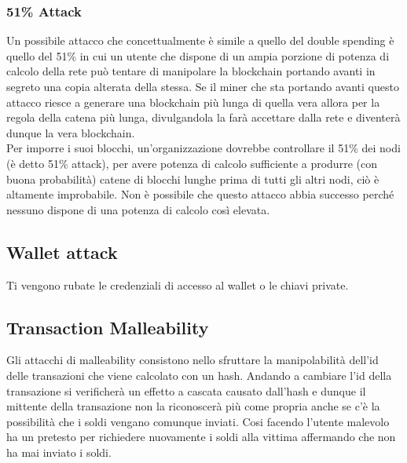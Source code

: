 \subsubsection{51\% Attack}

Un possibile attacco che concettualmente è simile a quello del double spending è
quello del 51\% in cui un utente che dispone di un ampia porzione di potenza di
calcolo della rete può tentare di manipolare la blockchain portando avanti in
segreto una copia alterata della stessa. Se il miner che sta portando avanti
questo attacco riesce a generare una blockchain più lunga di quella vera allora
per la regola della catena più lunga, divulgandola la farà accettare dalla rete
e diventerà dunque la vera blockchain.\\
Per imporre i suoi blocchi, un'organizzazione dovrebbe controllare il 51\% dei
nodi (è detto 51\% attack), per avere potenza di calcolo sufficiente a produrre
(con buona probabilità) catene di blocchi lunghe prima di tutti gli altri nodi,
ciò è altamente improbabile. Non è possibile che questo attacco abbia successo
perché nessuno dispone di una potenza di calcolo così elevata.

\subsection{Wallet attack}

Ti vengono rubate le credenziali di accesso al wallet o le chiavi private.

\subsection{Transaction Malleability }

Gli attacchi di malleability consistono nello sfruttare la manipolabilità
dell'id delle transazioni che viene calcolato con un hash. Andando a cambiare
l'id della transazione si verificherà un effetto a cascata causato dall'hash e
dunque il mittente della transazione non la riconoscerà più come propria anche
se c'è la possibilità che i soldi vengano comunque inviati. Cosi facendo
l'utente malevolo ha un pretesto per richiedere nuovamente i soldi alla vittima
affermando che non ha mai inviato i soldi.

\subsection{}
\subsection{}
